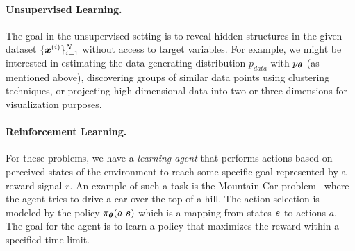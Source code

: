 \vspace{-3mm}
\paragraph{Unsupervised Learning.} The goal in the unsupervised setting is to reveal hidden structures in the given dataset $\{{\bm{x}}^{(i)}\}_{i=1}^{N}$ without access to target variables. For example, we might be interested in estimating the data generating distribution $p_{data}$ with $p_{{\bm{\theta}}}$ (as mentioned above), discovering groups of similar data points using clustering techniques, or projecting high-dimensional data into two or three dimensions for visualization purposes. 


\vspace{-3mm}
\paragraph{Reinforcement Learning.} For these problems, we have a \textit{learning agent}
that performs actions based on perceived states of the environment to reach some specific goal represented by a reward signal $r$. An example of such a task is the Mountain Car problem~\cite{sutton2018reinforcement} where the agent tries to drive a car over the top of a hill. The action selection is modeled by the policy $\pi_{{\bm{\theta}}}(a | {\bm{s}})$ which is a mapping from states ${\bm{s}}$ to actions $a$. The goal for the agent is to learn a policy that maximizes the reward within a specified time limit. 


